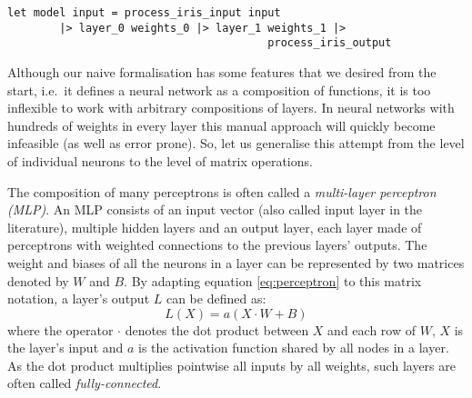 \documentclass[runningheads]{llncs}
\begin{document}

\begin{lstlisting}[language=caml]
let model input = process_iris_input input
        |> layer_0 weights_0 |> layer_1 weights_1 |>
                                        process_iris_output
\end{lstlisting}

Although our naive formalisation has some features that we desired from the start, i.e.\ it defines a neural network as a composition of functions,
it is too inflexible to work with arbitrary compositions of layers.
In neural networks with hundreds of weights in every layer this manual approach will quickly become infeasible (as well as error prone).
So, let us generalise this attempt from the level of individual neurons to the level of matrix operations.

The composition of many perceptrons is often called a \emph{multi-layer perceptron (MLP)}.
An MLP consists of an input vector (also called input layer in the literature),
multiple hidden layers and an output layer, each layer 
made of perceptrons with weighted connections to the previous layers' outputs. %
The weight and biases of all the neurons in a layer can be represented by two matrices denoted by $W$ and $B$. By adapting equation \ref{eq:perceptron} to this matrix notation, a layer's output $L$ can be defined as:
\begin{equation}
	L(X) = a(X \cdot W + B)
\end{equation}
where the operator $\cdot $ denotes the dot product between $X$ and each row of $W$, %
$X$ is the layer's input and $a$ is the activation function shared by all nodes in a layer. %
As the dot product multiplies pointwise all inputs by all weights, such layers are often called \emph{fully-connected}. %
\end{document}
